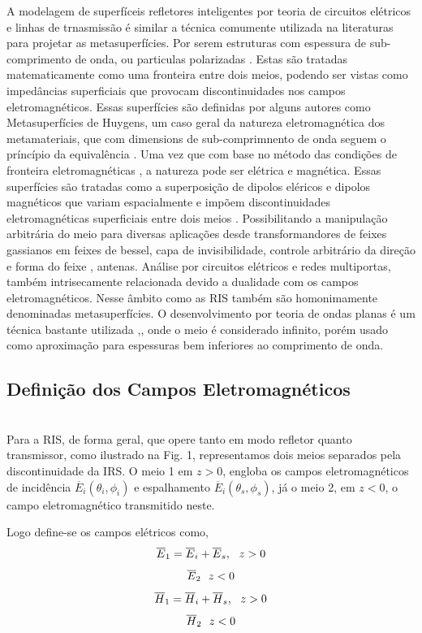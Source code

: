 \documentclass[
	12pt,				%
	openright,			%
	oneside,			%
	a4paper,			%
	english,			%
	brazil				%
	]{abntex2}
\begin{document}
A modelagem de superfíceis refletores inteligentes por teoria de circuitos elétricos e linhas de trnasmissão é similar a técnica comumente utilizada na literaturas para projetar as metasuperfícies. Por serem estruturas com espessura de sub-comprimento de onda, ou particulas polarizadas . Estas são tratadas matematicamente como uma fronteira entre dois meios, podendo ser vistas como impedâncias superficiais que provocam discontinuidades nos campos eletromagnéticos. Essas superfícies são definidas por alguns autores como Metasuperfícies de Huygens, um caso geral da natureza eletromagnética dos metamateriais, que com dimensions de sub-comprimnento de onda seguem o príncípio da equivalência  \cite{BalanisAEM}. Uma vez que com base no método das condições de fronteira eletromagnéticas , a natureza pode ser elétrica e magnética. Essas superfícies são tratadas como a superposição de dipolos eléricos e dipolos magnéticos que variam espacialmente e impõem discontinuidades eletromagnéticas superficiais entre dois meios \cite{GSTC}. Possibilitando a manipulação arbitrária do meio para diversas aplicações desde transformandores de feixes gassianos em feixes de bessel, capa de invisibilidade, controle arbitrário da direção e forma do feixe , antenas. Análise por circuitos elétricos e redes multiportas, também intrisecamente relacionada devido a dualidade com os campos eletromagnéticos.
Nesse âmbito como as RIS também são homonimamente denominadas metasuperfícies. O desenvolvimento por teoria de ondas planas é um técnica bastante utilizada \cite{BalanisAEM},\cite{EMPWTL}, onde o meio é considerado infinito, porém usado como aproximação para espessuras bem inferiores ao comprimento de onda.


\subsection{Definição dos Campos Eletromagnéticos}
\\
Para a RIS, de forma geral, que opere tanto em modo refletor quanto transmissor, como ilustrado na Fig. 1, representamos dois meios separados pela discontinuidade da IRS. O meio 1 em $z>0$, engloba os campos eletromagnéticos de incidência $\overline{E}_{i}(\theta_i,\phi_i)$ e espalhamento $\overline{E}_{i}(\theta_s,\phi_s)$, já o meio 2, em $z<0$, o campo eletromagnético transmitido neste.

Logo define-se os campos elétricos como,\\
\begin{equation}
      \overline{E}_{1}=\overline{E}_{i}
      +\overline{E}_{s}, \ \ z > 0\\
\end{equation}
\begin{equation}
       \overline{E}_{2} \   \ z < 0 \\
\end{equation}
\begin{equation}
      \overline{H}_{1}=\overline{H}_{i}
      +\overline{H}_{s}, \ \ z > 0\\
\end{equation}
\begin{equation}
       \overline{H}_{2}\   \ z < 0 \\
\end{equation}
\end{document}
